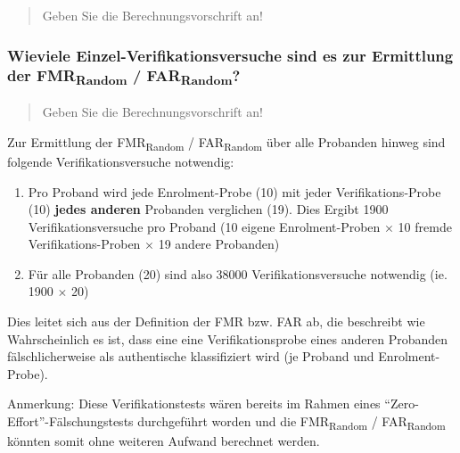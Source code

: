 \documentclass{article}
\newcommand{\annotation}[1]{
    \begin{quote}
    	\begin{textit}{#1}\end{textit}
    \end{quote}
}
\begin{document}
\annotation{Geben Sie die Berechnungsvorschrift an!}

\subsubsection{Wieviele Einzel-Verifikationsversuche sind es zur Ermittlung der FMR\textsubscript{Random} / FAR\textsubscript{Random}?}

\annotation{Geben Sie die Berechnungsvorschrift an!}

Zur Ermittlung der FMR\textsubscript{Random} / FAR\textsubscript{Random} über alle Probanden hinweg sind folgende Verifikationsversuche notwendig:

\begin{enumerate}
	\item Pro Proband wird jede Enrolment-Probe (10) mit jeder Verifikations-Probe (10) \textbf{jedes anderen} Probanden verglichen (19). Dies Ergibt 1900 Verifikationsversuche pro Proband (10 eigene Enrolment-Proben $\times$ 10 fremde Verifikations-Proben $\times$ 19 andere Probanden)
	\item Für alle Probanden (20) sind also 38000 Verifikationsversuche notwendig (ie. 1900 $\times$ 20)
\end{enumerate}

Dies leitet sich aus der Definition der FMR bzw. FAR ab, die beschreibt wie Wahrscheinlich es ist, dass 
eine eine Verifikationsprobe eines anderen Probanden fälschlicherweise als authentische klassifiziert wird 
(je Proband und Enrolment-Probe).

Anmerkung: Diese Verifikationstests wären bereits im Rahmen eines ``Zero-Effort''-Fälschungstests 
durchgeführt worden und die FMR\textsubscript{Random} / FAR\textsubscript{Random} könnten somit ohne 
weiteren Aufwand berechnet werden.
\end{document}
